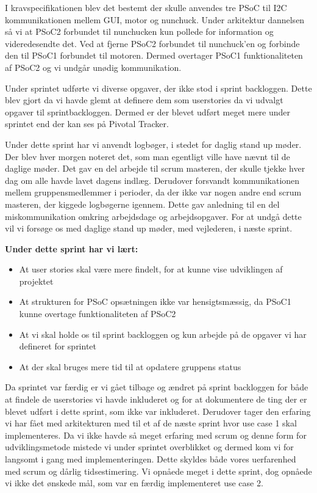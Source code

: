 	I kravspecifikationen blev det bestemt der skulle anvendes tre PSoC til I2C kommunikationen mellem GUI, motor og nunchuck. Under arkitektur dannelsen så vi at PSoC2 forbundet til nunchucken kun pollede for information og videredesendte det. Ved at fjerne PSoC2 forbundet til nunchuck'en og forbinde den til PSoC1 forbundet til motoren. Dermed overtager PSoC1 funktionaliteten af PSoC2 og vi undgår unødig kommunikation. \newline
	
	Under sprintet udførte vi diverse opgaver, der ikke stod i sprint backloggen. Dette blev gjort da vi havde glemt at definere dem som userstories da vi udvalgt opgaver til sprintbackloggen. Dermed er der blevet udført meget mere under sprintet end der kan ses på Pivotal Tracker. \newline
	
	Under dette sprint har vi anvendt logbøger, i stedet for daglig stand up møder. Der blev hver morgen noteret det, som man egentligt ville have nævnt til de daglige møder. Det gav en del arbejde til scrum masteren, der skulle tjekke hver dag om alle havde lavet dagens indlæg. Derudover forsvandt kommunikationen mellem gruppensmedlemmer i perioder, da der ikke var nogen andre end scrum masteren, der kiggede logbøgerne igennem. Dette gav anledning til en del miskommunikation omkring arbejdsdage og arbejdsopgaver. For at undgå dette vil vi forsøge os med daglige stand up møder, med vejlederen, i næste sprint. \newline
	
	\textbf{Under dette sprint har vi lært:}
	\begin{itemize}
		\item At user stories skal være mere findelt, for at kunne vise udviklingen af projektet
		\item At strukturen for PSoC opsætningen ikke var hensigtsmæssig, da PSoC1 kunne overtage funktionaliteten af PSoC2
		\item At vi skal holde os til sprint backloggen og kun arbejde på de opgaver vi har defineret for sprintet
		\item At der skal bruges mere tid til at opdatere gruppens status
	\end{itemize}
	
	Da sprintet var færdig er vi gået tilbage og ændret på sprint backloggen for både at findele de userstories vi havde inkluderet og for at dokumentere de ting der er blevet udført i dette sprint, som ikke var inkluderet. Derudover tager den erfaring vi har fået med arkitekturen med til et af de næste sprint hvor use case 1 skal implementeres. Da vi ikke havde så meget erfaring med scrum og denne form for udviklingsmetode mistede vi under sprintet overblikket og dermed kom vi for langsomt i gang med implementeringen. Dette skyldes både vores uerfarenhed med scrum og dårlig tidsestimering. Vi opnåede meget i dette sprint, dog opnåede vi ikke det ønskede mål, som var en færdig implementeret use case 2. 
	
